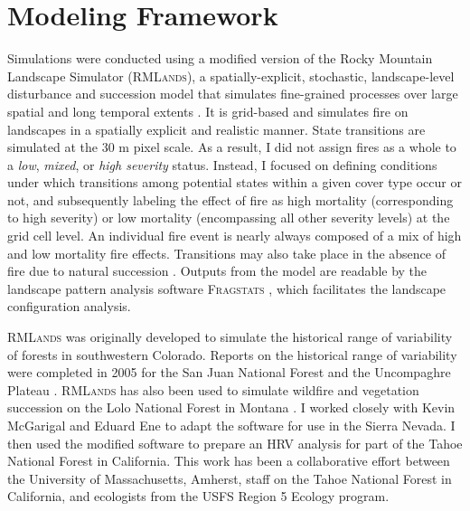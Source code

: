 \section{Modeling Framework}
\label{sec:modelframework}

Simulations were conducted using a modified version of the Rocky Mountain Landscape Simulator (\textsc{RMLands}), a spatially-explicit, stochastic, landscape-level disturbance and succession model that simulates fine-grained processes over large spatial and long temporal extents \citep{McGarigal2001}. It is grid-based and simulates fire on landscapes in a spatially explicit and realistic manner. State transitions are simulated at the 30 m pixel scale. As a result, I did not assign fires as a whole to a \emph{low}, \emph{mixed}, or \emph{high severity} status. Instead, I focused on defining conditions under which transitions among potential states within a given cover type occur or not, and subsequently labeling the effect of fire as high mortality (corresponding to high severity) or low mortality (encompassing all other severity levels) at the grid cell level. An individual fire event is nearly always composed of a mix of high and low mortality fire effects. Transitions may also take place in the absence of fire due to natural succession \citep{McGarigal2012}. Outputs from the model are readable by the landscape pattern analysis software \textsc{Fragstats} \citep{Fragstats2012}, which facilitates the landscape configuration analysis.

\textsc{RMLands} was originally developed to simulate the historical range of variability of forests in southwestern Colorado. Reports on the historical range of variability were completed in 2005 for the San Juan National Forest and the Uncompaghre Plateau \citep{McGarigal2005,McGarigal2005a}. \textsc{RMLands} has also been used to simulate wildfire and vegetation succession on the Lolo National Forest in Montana \citep{Cushman2011}. I worked closely with Kevin McGarigal and Eduard Ene to adapt the software for use in the Sierra Nevada. I then used the modified software to prepare an HRV analysis for part of the Tahoe National Forest in California. This work has been a collaborative effort between the University of Massachusetts, Amherst, staff on the Tahoe National Forest in California, and ecologists from the USFS Region 5 Ecology program. 

